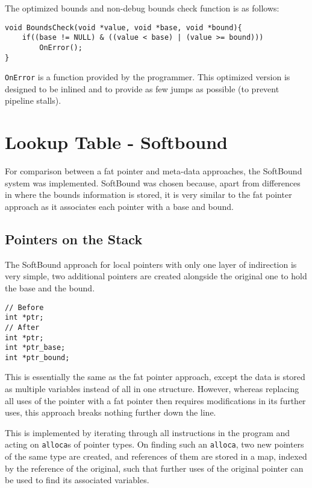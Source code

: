 The optimized bounds and non-debug bounds check function is as follows:

\begin{verbatim}
void BoundsCheck(void *value, void *base, void *bound){
    if((base != NULL) & ((value < base) | (value >= bound)))
        OnError();
}
\end{verbatim}

\verb!OnError! is a function provided by the programmer.
This optimized version is designed to be inlined and to provide as few jumps as possible (to prevent pipeline stalls).

\section{Lookup Table - Softbound}

For comparison between a fat pointer and meta-data approaches, the SoftBound system was implemented.
SoftBound was chosen because, apart from differences in where the bounds information is stored, it is very similar to the fat pointer approach as it associates each pointer with a base and bound.

\subsection{Pointers on the Stack}

The SoftBound approach for local pointers with only one layer of indirection is very simple, two additional pointers are created alongside the original one to hold the base and the bound.

\begin{verbatim}
// Before
int *ptr;
// After
int *ptr;
int *ptr_base;
int *ptr_bound;
\end{verbatim}

This is essentially the same as the fat pointer approach, except the data is stored as multiple variables instead of all in one structure.
However, whereas replacing all uses of the pointer with a fat pointer then requires modifications in its further uses, this approach breaks nothing further down the line.

This is implemented by iterating through all instructions in the program and acting on \verb!alloca!s of pointer types.
On finding such an \verb!alloca!, two new pointers of the same type are created, and references of them are stored in a map, indexed by the reference of the original, such that further uses of the original pointer can be used to find its associated variables.


